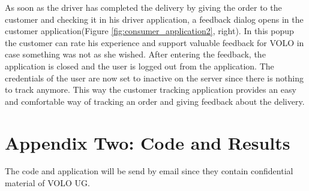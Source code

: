As soon as the driver has completed the delivery by giving the order to the customer and checking it in his driver application, a feedback dialog opens in the customer application(Figure \ref{fig:consumer_application2}, right). In this popup the customer can rate his experience and support valuable feedback for VOLO in case something was not as she wished.\newline
After entering the feedback, the application is closed and the user is logged out from the application. The credentials of the user are now set to inactive on the server since there is nothing to track anymore.\newline
This way the customer tracking application provides an easy and comfortable way of tracking an order and giving feedback about the delivery.
\newpage
\section{Appendix Two: Code and Results}\label{section:Appendix Two: Code and Results}

The code and application will be send by email since they contain confidential material of VOLO UG.
